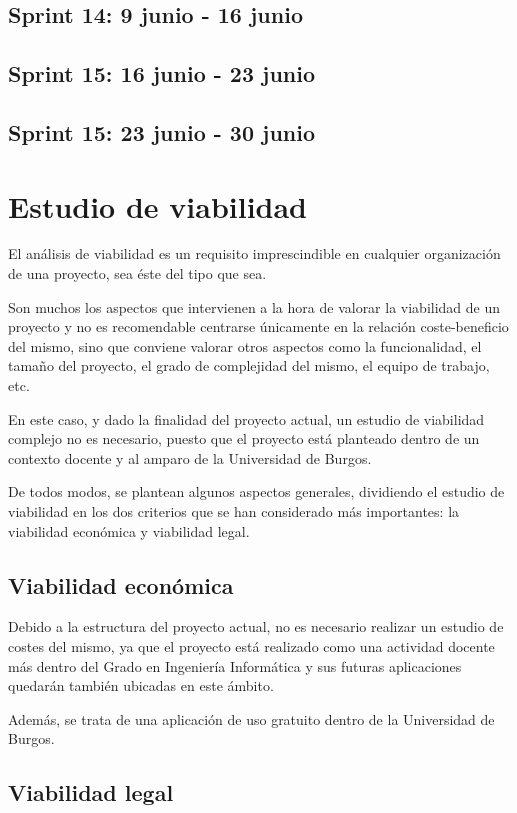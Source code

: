 \subsection{Sprint 14: 9 junio - 16 junio}
\subsection{Sprint 15: 16 junio - 23 junio}
\subsection{Sprint 15: 23 junio - 30 junio}

\section{Estudio de viabilidad}

El análisis de viabilidad es un requisito imprescindible en cualquier organización de una proyecto, sea éste del tipo que sea.

Son muchos los aspectos que intervienen a la hora de valorar la viabilidad de un proyecto y no es recomendable centrarse únicamente en la relación coste-beneficio del mismo, sino que conviene valorar otros aspectos como la funcionalidad, el tamaño del proyecto, el grado de complejidad del mismo, el equipo de trabajo, etc.

En este caso, y dado la finalidad del proyecto actual, un estudio de viabilidad complejo no es necesario, puesto que el proyecto está planteado dentro de un contexto docente y al amparo de la Universidad de Burgos. 

De todos modos, se plantean algunos aspectos generales, dividiendo el estudio de viabilidad en los dos criterios que se han considerado más importantes: la viabilidad económica y viabilidad legal.

\subsection{Viabilidad económica}

Debido a la estructura del proyecto actual, no es necesario realizar un estudio de costes del mismo, ya que el proyecto está realizado como una actividad docente más dentro del Grado en Ingeniería Informática y sus futuras aplicaciones quedarán también ubicadas en este ámbito.

Además, se trata de una aplicación de uso gratuito dentro de la Universidad de Burgos.

\subsection{Viabilidad legal}

